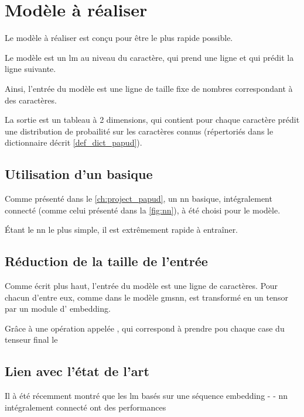 \chapter{Modèle à réaliser}\label{ch:papud_model}
Le modèle à réaliser est conçu pour être le plus rapide possible.

Le modèle est un \gls{lm} au niveau du caractère, qui prend une ligne et qui prédit la ligne suivante.

Ainsi, l'entrée du modèle est une ligne de taille fixe de nombres correspondant à des caractères.

La sortie est un tableau à 2 dimensions, qui contient pour chaque caractère prédit une distribution de probailité sur les caractères connus (répertoriés dans le dictionnaire décrit \autoref{def_dict_papud}).


\section{Utilisation d'un  basique}
Comme présenté dans le \autoref{ch:project_papud}, un \gls{nn} basique, intégralement connecté (comme celui présenté dans la \autoref{fig:nn}), à été choisi pour le modèle.

Étant le \gls{nn} le plus simple, il est extrêmement rapide à entraîner.

\section{Réduction de la taille de l'entrée}
Comme écrit plus haut, l'entrée du modèle est une ligne de caractères.
Pour chacun d'entre eux, comme dans le modèle \gls{gmsnn}, est transformé en un \gls{tensor} par un module d' \gls{embedding}. %

Grâce à une opération appelée \og {} \fg{}, qui correspond à prendre pou chaque case du tenseur final le 

\section{Lien avec l'état de l'art}
Il à été récemment montré que les \gls{lm} basés sur une séquence \og \gls{embedding} -  - \gls{nn} intégralement connecté \fg{}
ont des performances %


%
%
%
%
%

